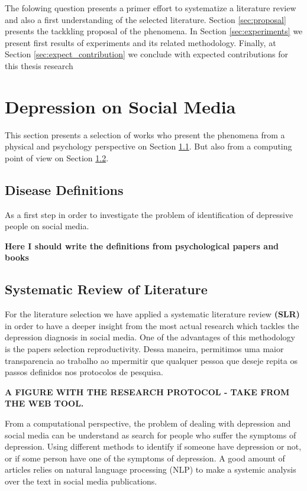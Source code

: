 \documentclass[sigconf]{acmart}
\begin{document}
The folowing question presents a primer effort to systematize a literature review and also a first understanding of the selected literature. Section \ref{sec:proposal} presents the tackkling proposal of the phenomena. In Section \ref{sec:experiments} we present first results of experiments and its related methodology. Finally, at Section \ref{sec:expect_contribution} we conclude with expected contributions for this thesis research

\section{Depression on Social Media}\label{sec:depression_SM}
This section presents a selection of works who present the phenomena from a physical and psychology perspective on Section \ref{subsec:definitions}. But also from a computing point of view on Section \ref{subsec:srl}.

\subsection{Disease Definitions}\label{subsec:definitions}
As a first step in order to investigate the problem of identification of depressive people on social media.

\textbf{Here I should write the definitions from psychological papers and books}

\subsection{Systematic Review of Literature}\label{subsec:srl}
For the literature selection we have applied a systematic literature review \textbf{(SLR)} in order to have a deeper insight from the most actual research which tackles the depression diagnosis in social media. One of the advantages of this methodology is the papers selection reproductivity. Dessa maneira, permitimos uma maior transparencia ao trabalho ao mpermitir que qualquer pessoa que deseje repita os passos definidos nos protocolos de pesquisa.

\textbf{A FIGURE WITH THE RESEARCH PROTOCOL - TAKE FROM THE WEB TOOL.}

From a computational perspective, the problem of dealing with depression and social media can be understand as search for people who suffer the symptoms of depression. Using different methods to identify if someone have depression or not, or if some person have one of the symptoms of depression. A good amount of articles relies on natural language processing (NLP) to make a systemic analysis over the text in social media publications.
\end{document}
